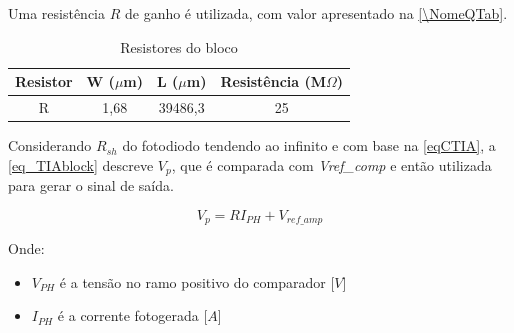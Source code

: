 Uma resist\^encia $R$ de ganho \'e utilizada, com valor apresentado na \autoref{\NomeQTab}.

\begin{table}[htb]
\caption{Resistores do bloco \NomeBloco}
\label{\NomeQTab}
\centering
\begin{tabular}{cccc}
\toprule
Resistor & W ($\mu$m)  & L ($\mu$m) & Resist\^encia (M$\Omega$)\\
\midrule \midrule
R & 1,68 & 39486,3 & 25\\
\bottomrule
\end{tabular}
\end{table}

Considerando $R_{sh}$ do fotodiodo tendendo ao infinito e com base na \autoref{eqCTIA}, a \autoref{eq_TIAblock} descreve $V_{p}$, que \'e comparada com \emph{Vref\_comp} e ent\~ao utilizada para gerar o sinal de sa\'ida.

\begin{equation}
    \label{eq_TIAblock}
    V_{p} = RI_{PH} + V_{ref\_amp}
\end{equation}

Onde:

\begin{itemize}

    \item \emph{$V_{PH}$} \'e a tens\~ao no ramo positivo do comparador [$V$]
    \item \emph{$I_{PH}$} \'e a corrente fotogerada [$A$]
    
\end{itemize}